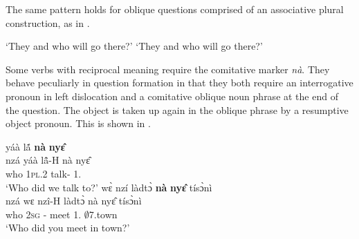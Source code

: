 \noindent The same pattern holds for oblique questions comprised of an associative plural construction, as in .

\ea\label{AQ2}
    \trans `They and who will go there?'
    \trans `They and who will go there?'
\z
\z



Some verbs with reciprocal meaning require the comitative marker {\itshape nà}. They behave peculiarly in question formation in that they both require an interrogative pronoun in left dislocation and a comitative oblique noun phrase at the end of the question. The object is taken up again in the oblique phrase by a resumptive object pronoun. This is shown in .

\ea\label{QCOM}
\ea  \label{QCOM1}
   yáà lã́ {\bfseries nà} {\bfseries nyɛ̂}  \\
              nzá yáà lã̂-H nà nyɛ̂ \\
                who 1\textsc{pl}.{\PST}2 talk-{\R} {\COM} 1.{\OBJ} \\
    \trans `Who did we talk to?'
\ex\label{QCOM2}
  wɛ̀ nzí làdtɔ̀ {\bfseries nà} {\bfseries nyɛ̂} tísɔ̀nì \\
            nzá wɛ nzî-H làdtɔ̀ nà nyɛ̂ tísɔ̀nì \\
              who 2\textsc{sg} {\PROG}-{\PST} meet {\COM} 1.{\OBJ}  $\emptyset$7.town\\
    \trans `Who did you meet in town?'
\z
\z




